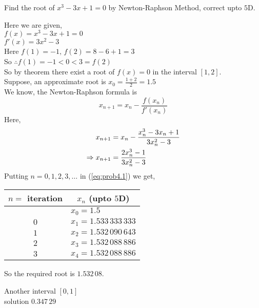 \documentclass[12pt,class=book,crop=false]{standalone}
\begin{document}
\begin{prob}
    Find the root of \( x^3-3x+1=0 \) by Newton-Raphson Method, correct upto \( 5 \)D.
\end{prob}
\begin{soln}
    Here we are given,\\
    \indent \( f(x)=x^3-3x+1=0 \)\\
    \indent \( f'(x)=3x^2-3 \)\\
    Here \( f(1)=-1,\,f(2)=8-6+1=3 \)\\
    So \(\therefore f(1)=-1<0<3=f(2)\)\\
    So by theorem there exist a root of \( f(x)=0 \) in the interval \( [1,2] \).\\
    Suppose, an approximate root is \( x_0=\frac{1+2}{2}=1.5 \)\\
    We know, the Newton-Raphson formula is
    \[
        x_{n+1}=x_n-\frac{f(x_n)}{f'(x_n)}
    \]
    Here,
    \begin{align}
        x_{n+1}             & =x_n-\frac{x_n^3-3x_n+1}{3x_n^2-3}\notag     \\
        \Rightarrow x_{n+1} & =\frac{2x_n^3-1}{3x_n^2-3}\label{eq:prob4.1}
    \end{align}
    Putting \( n=0,1,2,3,\dots \) in (\ref{eq:prob4.1}) we get,
    \begin{center}
        \begin{tabular}{cl}
            \toprule
            \( n= \) iteration & \multicolumn{1}{c}{\( x_n  \) (upto \( 5 \)D)} \\\midrule
                               & \(x_0 = 1.5\)                                  \\
            \(0\)              & \(x_1  = 1.533\,333\,333\)                     \\
            \( 1 \)            & \(x_2= 1.532\,090\,643   \)                    \\
            \( 2 \)            & \(x_3= 1.532\,088\,886  \)                     \\
            \( 3 \)            & \(x_4= 1.532\,088\,886 \)                      \\\bottomrule
        \end{tabular}
    \end{center}
    So the required root is \( 1.532\,08 \).
    \begin{note}
        Another interval \( [0,1] \)\\
        solution \( 0.347\,29 \)
    \end{note}
\end{soln}
\end{document}

